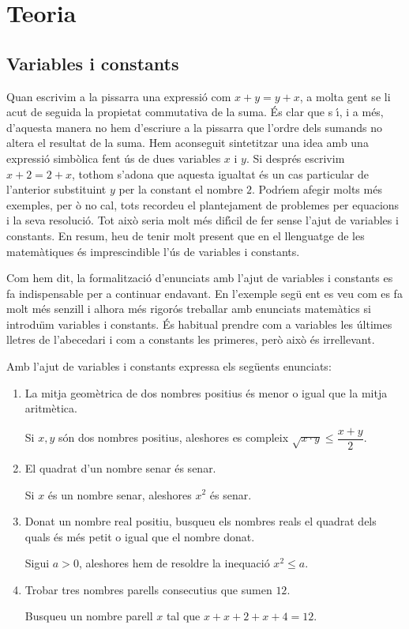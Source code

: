 \chapter{Teoria}
\label{cap:teoria}

\section{Variables i constants}

Quan escrivim a la pissarra una expressi\'{o} com $x+y=y+x$, a molta gent se
li acut de seguida la propietat commutativa de la suma. \'{E}s clar que s%
\'{\i}, i a m\'{e}s, d'aquesta manera no hem d'escriure a la pissarra que
l'ordre dels sumands no altera el resultat de la suma. Hem aconseguit
sintetitzar una idea amb una expressi\'{o} simb\`{o}lica fent \'{u}s de dues
variables $x$ i $y$. Si despr\'{e}s escrivim $x+2=2+x$, tothom s'adona que
aquesta igualtat \'{e}s un cas particular de l'anterior substituint $y$ per
la constant el nombre $2$. Podr\'{\i}em afegir molts m\'{e}s exemples, per%
\`{o} no cal, tots recordeu el plantejament de problemes per equacions i la
seva resoluci\'{o}. Tot aix\`{o} seria molt m\'{e}s dif\'{\i}cil de fer
sense l'ajut de variables i constants. En resum, heu de tenir molt present
que en el llenguatge de les matem\`{a}tiques \'{e}s imprescindible l'\'{u}s
de variables i constants.

Com hem dit, la formalitzaci\'{o} d'enunciats amb l'ajut de variables i
constants es fa indispensable per a continuar endavant. En l'exemple seg\"{u}%
ent es veu com es fa molt m\'{e}s senzill i alhora m\'{e}s rigor\'{o}s
treballar amb enunciats matem\`{a}tics si introdu\"{\i}m variables i
constants. \'{E}s habitual prendre com a variables les \'{u}ltimes lletres
de l'abecedari i com a constants les primeres, per\`{o} aix\`{o} \'{e}s
irrellevant.

\begin{exemple}
Amb l'ajut de variables i constants expressa els seg\"{u}ents enunciats:

\begin{enumerate}
\item La mitja geom\`{e}trica de dos nombres positius \'{e}s menor o igual
que la mitja aritm\`{e}tica.

Si $x,y$ s\'{o}n dos nombres positius, aleshores es compleix $\sqrt{x\cdot y}%
\leq\dfrac{x+y}{2}$.

\item El quadrat d'un nombre senar \'{e}s senar.

Si $x$ \'{e}s un nombre senar, aleshores \thinspace$x^{2}$ \'{e}s senar.

\item Donat un nombre real positiu, busqueu els nombres reals el quadrat
dels quals \'{e}s m\'{e}s petit o igual que el nombre donat.

Sigui $a>0$, aleshores hem de resoldre la inequaci\'{o} $x^{2}\leq a$.

\item Trobar tres nombres parells consecutius que sumen $12$.

Busqueu un nombre parell $x$ tal que $x+x+2+x+4=12$.
\end{enumerate}
\end{exemple}

